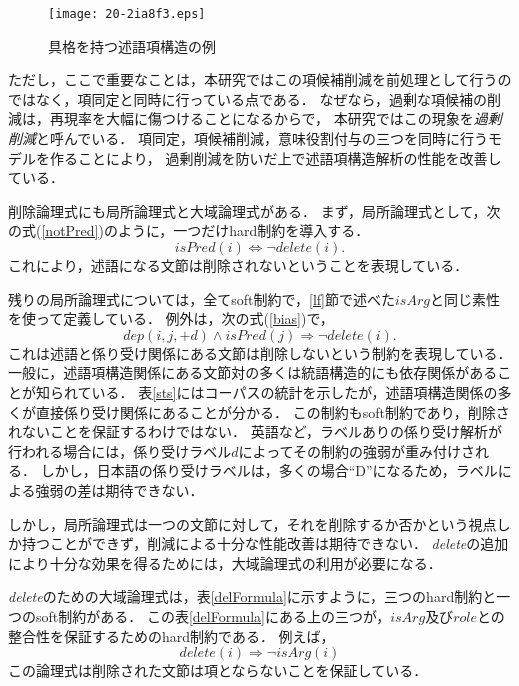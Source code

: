 \documentclass[japanese]{jnlp_1.4}
\begin{document}
\begin{figure}[t]
\begin{center}
\texttt{[image: 20-2ia8f3.eps]}
\end{center}
  \caption{具格を持つ述語項構造の例}
\label{example2}
\end{figure}

ただし，ここで重要なことは，本研究ではこの項候補削減を前処理として行うのではなく，項同定と同時に行っている点である．
なぜなら，過剰な項候補の削減は，再現率を大幅に傷つけることになるからで，
本研究ではこの現象を\emph{過剰削減}と呼んでいる．
項同定，項候補削減，意味役割付与の三つを同時に行うモデルを作ることにより，
過剰削減を防いだ上で述語項構造解析の性能を改善している．

削除論理式にも局所論理式と大域論理式がある．
まず，局所論理式として，次の式(\ref{notPred})のように，一つだけhard制約を導入する．
\begin{equation}
 \mathit{isPred}(i) \Leftrightarrow \neg \mathit{delete}(i). \label{notPred}
\end{equation}
これにより，述語になる文節は削除されないということを表現している．

残りの局所論理式については，全てsoft制約で，\ref{lf}節で述べた$\mathit{isArg}$と同じ素性を使って定義している．
例外は，次の式(\ref{bias})で，
\begin{equation}
 \mathit{dep}(i,j,+d) \wedge \mathit{isPred}(j) \Rightarrow \neg \mathit{delete}(i). \label{bias}
\end{equation}
これは述語と係り受け関係にある文節は削除しないという制約を表現している．
一般に，述語項構造関係にある文節対の多くは統語構造的にも依存関係があることが知られている．
表\ref{sts}にはコーパスの統計を示したが，述語項構造関係の多くが直接係り受け関係にあることが分かる．
この制約もsoft制約であり，削除されないことを保証するわけではない．
英語など，ラベルありの係り受け解析が行われる場合には，係り受けラベル$d$によってその制約の強弱が重み付けされる．
しかし，日本語の係り受けラベルは，多くの場合``D''になるため，ラベルによる強弱の差は期待できない．

しかし，局所論理式は一つの文節に対して，それを削除するか否かという視点しか持つことができず，削減による十分な性能改善は期待できない．
\emph{delete}の追加により十分な効果を得るためには，大域論理式の利用が必要になる．

\emph{delete}のための大域論理式は，表\ref{delFormula}に示すように，三つのhard制約と一つのsoft制約がある．
この表\ref{delFormula}にある上の三つが，$\mathit{isArg}$及び$\mathit{role}$との整合性を保証するためのhard制約である．
例えば，
\begin{equation}
 \mathit{delete}(i) \Rightarrow \neg \mathit{isArg}(i) 
\end{equation}
この論理式は削除された文節は項とならないことを保証している．
\end{document}
